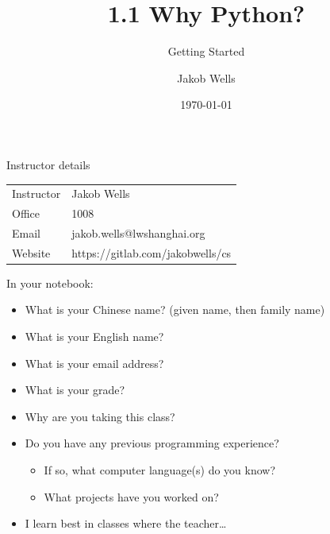 \documentclass[aspectratio=169]{beamer}
\title{1.1 Why Python?}
\subtitle{Getting Started}
\author{Jakob Wells}
\begin{document}
\date{\today}


\begin{frame}
    \titlepage{}
\end{frame}

\begin{frame}{Instructor details}
    \begin{table}
    \centering
        \begin{tabular}{ll}
            Instructor & Jakob Wells                      \\
            Office     & 1008                             \\
            Email      & jakob.wells@lwshanghai.org       \\
            Website    & https://gitlab.com/jakobwells/cs \\
        \end{tabular}
    \end{table}   
\end{frame}


\begin{frame}{In your notebook:}
    \begin{itemize}[label=--]
        \item What is your Chinese name? (given name, then family name)
        \item What is your English name?
        \item What is your email address?
        \item What is your grade?
        \item Why are you taking this class?
        \item Do you have any previous programming experience?
            \begin{itemize}[label=\(\blacktriangleright\),itemsep=5pt]
                \item If so, what computer language(s) do you know?
                \item What projects have you worked on?
            \end{itemize}
        \item I learn best in classes where the teacher\ldots
    \end{itemize}
\end{frame}
\end{document}
